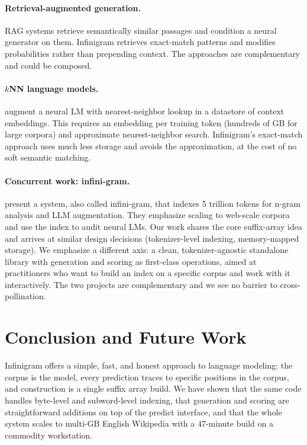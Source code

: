 \documentclass[11pt]{article}
\begin{document}
\paragraph{Retrieval-augmented generation.}
RAG systems \citep{lewis2020rag,izacard2021atlas} retrieve semantically similar passages and condition a neural generator on them. Infinigram retrieves exact-match patterns and modifies probabilities rather than prepending context. The approaches are complementary and could be composed.

\paragraph{$k$NN language models.}
\citet{khandelwal2020knnlm} augment a neural LM with nearest-neighbor lookup in a datastore of context embeddings. This requires an embedding per training token (hundreds of GB for large corpora) and approximate nearest-neighbor search. Infinigram's exact-match approach uses much less storage and avoids the approximation, at the cost of no soft semantic matching.

\paragraph{Concurrent work: infini-gram.}
\citet{liu2024infini} present a system, also called infini-gram, that indexes 5 trillion tokens for n-gram analysis and LLM augmentation. They emphasize scaling to web-scale corpora and use the index to audit neural LMs. Our work shares the core suffix-array idea and arrives at similar design decisions (tokenizer-level indexing, memory-mapped storage). We emphasize a different axis: a clean, tokenizer-agnostic standalone library with generation and scoring as first-class operations, aimed at practitioners who want to build an index on a specific corpus and work with it interactively. The two projects are complementary and we see no barrier to cross-pollination.

\section{Conclusion and Future Work}

Infinigram offers a simple, fast, and honest approach to language modeling: the corpus is the model, every prediction traces to specific positions in the corpus, and construction is a single suffix array build. We have shown that the same code handles byte-level and subword-level indexing, that generation and scoring are straightforward additions on top of the predict interface, and that the whole system scales to multi-GB English Wikipedia with a 47-minute build on a commodity workstation.
\end{document}
